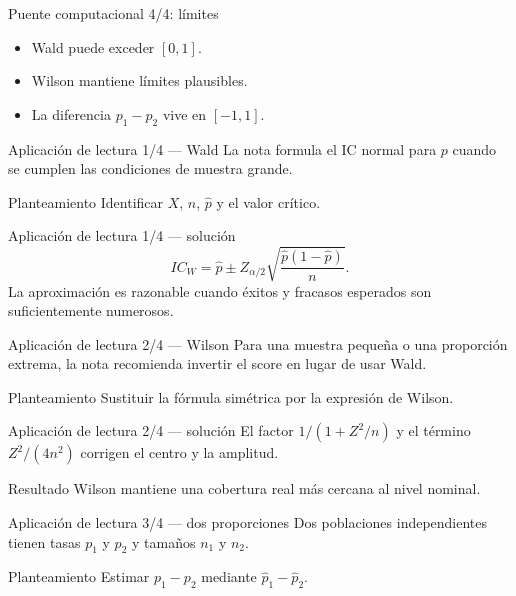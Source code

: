 \documentclass[10pt,aspectratio=169]{beamer}
\begin{document}
\begin{frame}{Puente computacional 4/4: límites}
  \footnotesize
  \begin{itemize}\itemsep=0.12cm
    \item Wald puede exceder $[0,1]$.
    \item Wilson mantiene límites plausibles.
    \item La diferencia $p_1-p_2$ vive en $[-1,1]$.
  \end{itemize}
\end{frame}

\begin{frame}{Aplicación de lectura 1/4 --- Wald}
  \footnotesize
  La nota formula el IC normal para $p$ cuando se cumplen las condiciones de
  muestra grande.
  \begin{block}{Planteamiento}
    Identificar $X$, $n$, $\hat p$ y el valor crítico.
  \end{block}
\end{frame}

\begin{frame}{Aplicación de lectura 1/4 --- solución}
  \footnotesize
  \[
    IC_W=\hat p\pm Z_{\alpha/2}
    \sqrt{\frac{\hat p(1-\hat p)}{n}}.
  \]
  La aproximación es razonable cuando éxitos y fracasos esperados son
  suficientemente numerosos.
\end{frame}

\begin{frame}{Aplicación de lectura 2/4 --- Wilson}
  \footnotesize
  Para una muestra pequeña o una proporción extrema, la nota recomienda
  invertir el score en lugar de usar Wald.
  \begin{block}{Planteamiento}
    Sustituir la fórmula simétrica por la expresión de Wilson.
  \end{block}
\end{frame}

\begin{frame}{Aplicación de lectura 2/4 --- solución}
  \footnotesize
  El factor $1/(1+Z^2/n)$ y el término $Z^2/(4n^2)$ corrigen el centro y la
  amplitud.
  \begin{alertblock}{Resultado}
    Wilson mantiene una cobertura real más cercana al nivel nominal.
  \end{alertblock}
\end{frame}

\begin{frame}{Aplicación de lectura 3/4 --- dos proporciones}
  \footnotesize
  Dos poblaciones independientes tienen tasas $p_1$ y $p_2$ y tamaños $n_1$ y
  $n_2$.
  \begin{block}{Planteamiento}
    Estimar $p_1-p_2$ mediante $\hat p_1-\hat p_2$.
  \end{block}
\end{frame}
\end{document}
